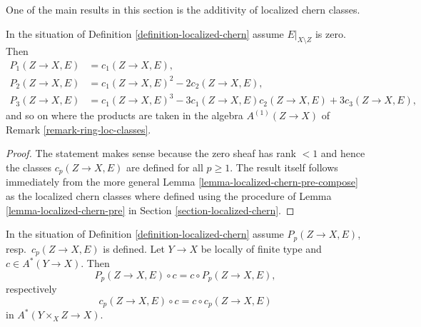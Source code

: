 \noindent
One of the main results in this section is the additivity
of localized chern classes.

\begin{lemma}
\label{lemma-loc-chern-character}
In the situation of Definition \ref{definition-localized-chern}
assume $E|_{X \setminus Z}$ is zero. Then
\begin{align*}
P_1(Z \to X, E) & = c_1(Z \to X, E), \\
P_2(Z \to X, E) & = c_1(Z \to X, E)^2 - 2c_2(Z \to X, E), \\
P_3(Z \to X, E) & = c_1(Z \to X, E)^3 - 3c_1(Z \to X, E)c_2(Z \to X, E)
+ 3c_3(Z \to X, E),
\end{align*}
and so on where the products are taken in the algebra $A^{(1)}(Z \to X)$
of Remark \ref{remark-ring-loc-classes}.
\end{lemma}

\begin{proof}
The statement makes sense because the zero sheaf has rank $< 1$ and
hence the classes $c_p(Z \to X, E)$ are defined for all $p \geq 1$.
The result itself follows immediately from the more general
Lemma \ref{lemma-localized-chern-pre-compose} as the localized chern
classes where defined using the procedure of
Lemma \ref{lemma-localized-chern-pre}
in Section \ref{section-localized-chern}.
\end{proof}

\begin{lemma}
\label{lemma-loc-chern-classes-commute}
In the situation of Definition \ref{definition-localized-chern}
assume $P_p(Z \to X, E)$, resp.\ $c_p(Z \to X, E)$ is defined.
Let $Y \to X$ be locally of finite type and $c \in A^*(Y \to X)$.
Then
$$
P_p(Z \to X, E) \circ c = c \circ P_p(Z \to X, E),
$$
respectively
$$
c_p(Z \to X, E) \circ c = c \circ c_p(Z \to X, E)
$$
in $A^*(Y \times_X Z \to X)$.
\end{lemma}

